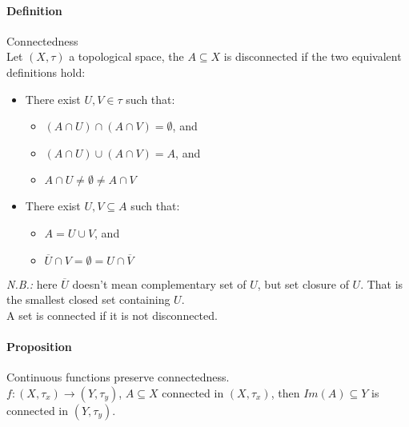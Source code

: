 \documentclass{article}
\newcommand{\func}[3]{#1 : #2 \rightarrow #3}
\newcommand{\Def}{\paragraph{Definition}}
\newcommand{\Proposition}{\paragraph{Proposition}}
\begin{document}
  \Def Connectedness
\\Let $(X, \tau)$ a topological space, the $A \subseteq X$ is disconnected if
  the two equivalent definitions hold:
  \begin{itemize}
    \item There exist $U, V \in \tau$ such that:
    \begin{itemize}
      \item $(A \cap U) \cap (A \cap V) = \emptyset$, and
      \item $(A \cap U) \cup (A \cap V) = A$, and
      \item $A \cap U \neq \emptyset \neq A \cap V$
    \end{itemize}

    \item There exist $U, V \subseteq A$ such that:
    \begin{itemize}
      \item $A = U \cup V$, and
      \item $\overline{U} \cap V = \emptyset = U \cap \overline{V}$
    \end{itemize}
  \end{itemize}
  \textit{N.B.:} here $\overline{U}$ doesn't mean complementary set of $U$, but
  set closure of $U$. That is the smallest closed set containing $U$.
\\A set is connected if it is not disconnected.

  \Proposition Continuous functions preserve connectedness.
\\$\func{f}{(X,\tau_x)}{(Y,\tau_y)}$, $A \subseteq X$ connected in $(X,\tau_x)$,
  then $Im(A) \subseteq Y$ is connected in $(Y,\tau_y)$.
\end{document}
